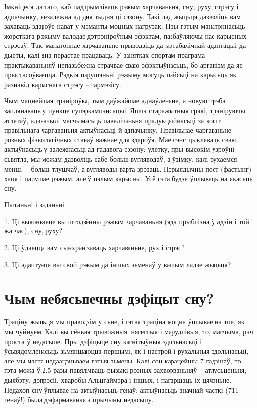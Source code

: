 Імкніцеся да таго, каб падтрымліваць рэжым харчаваньня, сну, руху, стрэсу і адпачынку, незалежна ад дня тыдня ці сэзону. Такі лад жыцьця дазволіць вам захаваць здароўе нават у моманты моцных нагрузак. Пры гэтым манатоннасьць жорсткага рэжыму валодае дэтрэніроўным эфэктам, пазбаўляючы нас карысных стрэсаў. Так, манатоннае харчаваньне прыводзіць да мэтабалічнай адаптацыі да дыеты, калі яна перастае працаваць. У занятках спортам праграма практыкаваньняў непазьбежна страчвае сваю эфэктыўнасьць, бо арганізм да яе прыстасоўваецца. Рэдкія парушэньні рэжыму могуць пайсьці на карысьць як разнавід карыснага стрэсу – гармэзісу.

Чым мацнейшая трэніроўка, тым даўжэйшае аднаўленьне, а новую трэба заплянаваць у пункце супэркампэнсацыі. Яшчэ старажытныя грэкі, трэніруючы атлетаў, адзначылі магчымасьць павелічэньня прадукцыйнасьці за кошт правільнага чаргаваньня актыўнасьці й адпачынку. Правільнае чаргаваньне розных фізыялягічных станаў важнае для здароўя. Мае сэнс цыкляваць сваю актыўнасьць у залежнасьці ад гадавога сэзону: улетку, пры высокім узроўні сьвятла, мы можам дазволіць сабе больш вугляводаў, а ўзімку, калі рухаемся менш, – больш тлушчаў, а вугляводы варта зрэзаць. Пэрыядычны пост (фастынг) хаця і парушае рэжым, але ў цэлым карысны. Усё гэта будзе ўплываць на якасьць сну.

Пытаньні і заданьні

1. Ці выконваеце вы штодзённы рэжым харчаваньня (яда прыблізна ў адзін і той жа час), сну, руху?

2. Ці ўдаецца вам сынхранізаваць харчаваньне, рух і стрэс?

3. Ці адаптуеце вы свой рэжым да іншых зьменаў у вашым ладзе жыцьця?


\section{Чым небясьпечны дэфіцыт сну?}

Траціну жыцьця мы праводзім у сьне, і гэтая траціна моцна ўплывае на тое, як мы чуйнуем. Калі вы сёньня трывожныя, нягеглыя і марудлівыя, то, магчыма, рэч проста ў недасыпе. Пры дэфіцыце сну кагнітыўныя здольнасьці і ўсьвядомленасьць зьмяншаюцца першымі, як і настрой і рухальныя здольнасьці, але мы часта недаацэньваем гэтыя зьмены. Калі сон карацейшы 7 гадзінаў, то гэта можа ў 2,5 разы павялічваць рызыкі розных захворваньняў – атлусьценьня, дыябэту, дэпрэсіі, хваробы Альцгаймэра і іншых, і пагаршаць іх цячэньне. Недахоп сну ўплывае на актыўнасьць генаў: актыўнасьць значнай часткі (711 генаў!) была дэфармаваная з прычыны недасыпу.

